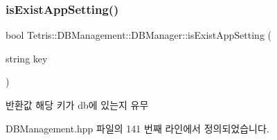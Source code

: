 \subsubsection{\texorpdfstring{is\+Exist\+App\+Setting()}{isExistAppSetting()}}
{\footnotesize\ttfamily bool Tetris\+::\+D\+B\+Management\+::\+D\+B\+Manager\+::is\+Exist\+App\+Setting (\begin{DoxyParamCaption}\item[{string}]{key }\end{DoxyParamCaption})\hspace{0.3cm}{\ttfamily [inline]}}

\begin{DoxyReturn}{반환값}
해당 키가 db에 있는지 유무 
\end{DoxyReturn}


D\+B\+Management.\+hpp 파일의 141 번째 라인에서 정의되었습니다.


